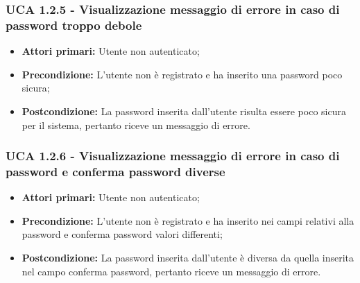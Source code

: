 \subsubsection{UCA 1.2.5 - Visualizzazione messaggio di errore in caso di password troppo debole}%
\begin{itemize}
\item \textbf{Attori primari:} Utente non autenticato;
\item \textbf{Precondizione:} L'utente non è registrato e ha inserito una password poco sicura;
\item \textbf{Postcondizione:} La password inserita dall'utente risulta essere poco sicura per il sistema, pertanto riceve un messaggio di errore.
\end{itemize}


\subsubsection{UCA 1.2.6 - Visualizzazione messaggio di errore in caso di password e conferma password diverse}%
\begin{itemize}
\item \textbf{Attori primari:} Utente non autenticato;
\item \textbf{Precondizione:} L'utente non è registrato e ha inserito nei campi relativi alla password e conferma password valori differenti;
\item \textbf{Postcondizione:} La password inserita dall'utente è diversa da quella inserita nel campo conferma password, pertanto riceve un messaggio di errore.
\end{itemize}

